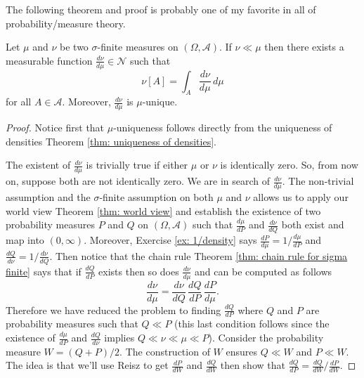 The following theorem and proof is probably one of my favorite in all of probability/measure theory.
\begin{theorem}
\label{thm: rn1}
Let $\mu$ and $\nu$ be two $\sigma$-finite measures on $(\Omega, \mathcal A)$. If $\nu \ll \mu$ then there exists a measurable function  $\frac{d\nu}{d\mu} \in \mathscr N$  such that
\[
\nu[A] = \int_A \frac{d\nu}{d\mu}\, d\mu
\]
for all $A\in \mathcal A$. Moreover, $\frac{d\nu}{d\mu}$ is $\mu$-unique.
\end{theorem}

\begin{proof}
Notice first that $\mu$-uniqueness follows directly from the uniqueness of densities Theorem \ref{thm: uniqueness of densities}.

The existent of $\frac{d\nu}{d\mu}$ is trivially true if either $\mu$ or $\nu$ is identically zero. So, from now on, suppose both are not identically zero.
We are in search of $\frac{d\nu}{d\mu}$. The non-trivial assumption and the $\sigma$-finite assumption on both $\mu$ and $\nu$  allows us to apply our world view Theorem  \ref{thm: world view} and establish the existence of two probability measures $P$ and $Q$ on $(\Omega, \mathcal A)$ such that $\frac{d\mu}{dP}$ and $\frac{d\nu}{dQ}$ both exist and map into $(0,\infty)$. Moreover, Exercise \ref{ex: 1/density} says $\frac{dP}{d\mu} = 1/\frac{d\mu}{dP}$ and  $\frac{dQ}{d\nu} = 1/\frac{d\nu}{dQ}$. Then notice that the chain rule Theorem
\ref{thm: chain rule for sigma finite} says that if $\frac{dQ}{dP}$ exists then so does $\frac{d\nu}{d\mu}$ and can be computed as follows
\[ \frac{d\nu}{d\mu}= \frac{d\nu}{dQ} \,\frac{dQ}{dP}\, \frac{dP}{d\mu}.\]
Therefore we have reduced the problem to finding $\frac{dQ}{dP}$ where $Q$ and $P$ are probability measures such that $Q \ll P$ (this last condition follows since the existence of $\frac{d\mu}{dP}$ and $\frac{dQ}{d\nu}$ implies $Q\ll \nu \ll \mu \ll P$).
Consider the probability measure $W = (Q + P)/2$.
The construction of $W$ ensures $Q \ll W$ and $P \ll W$. The idea is that we'll use Reisz to get $\frac{dP}{dW}$ and $\frac{dQ}{dW}$ then show that $\frac{dQ}{dP} = \frac{dQ}{dW} / \frac{dP}{dW}$.



\end{proof}
